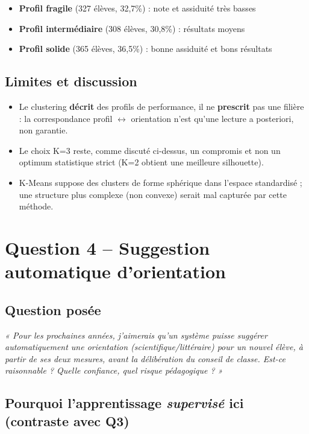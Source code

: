 \documentclass[11pt,a4paper]{article}
\begin{document}
\begin{itemize}
\item \textbf{Profil fragile} (327 élèves, 32,7\%) : note et assiduité très basses
\item \textbf{Profil intermédiaire} (308 élèves, 30,8\%) : résultats moyens
\item \textbf{Profil solide} (365 élèves, 36,5\%) : bonne assiduité et bons résultats
\end{itemize}

\subsection{Limites et discussion}
\begin{itemize}
\item Le clustering \textbf{décrit} des profils de performance, il ne
\textbf{prescrit} pas une filière : la correspondance profil $\leftrightarrow$
orientation n'est qu'une lecture a posteriori, non garantie.
\item Le choix K=3 reste, comme discuté ci-dessus, un compromis et non un optimum
statistique strict (K=2 obtient une meilleure silhouette).
\item K-Means suppose des clusters de forme sphérique dans l'espace standardisé ; une
structure plus complexe (non convexe) serait mal capturée par cette méthode.
\end{itemize}

\section{Question 4 -- Suggestion automatique d'orientation}

\subsection{Question posée}
\textit{« Pour les prochaines années, j'aimerais qu'un système puisse suggérer
automatiquement une orientation (scientifique/littéraire) pour un nouvel élève, à partir
de ses deux mesures, avant la délibération du conseil de classe. Est-ce raisonnable ?
Quelle confiance, quel risque pédagogique ? »}

\subsection{Pourquoi l'apprentissage \emph{supervisé} ici (contraste avec Q3)}
\end{document}
